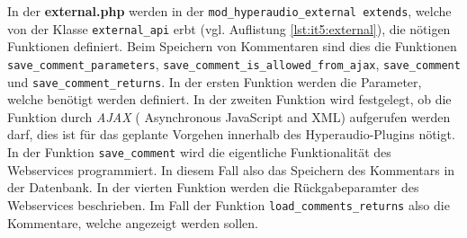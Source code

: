 In der \textbf{external.php} werden in der \texttt{mod_hyperaudio_external extends}, welche von der Klasse \texttt{external_api} erbt (vgl. Auflistung \ref{lst:it5:external}), die nötigen Funktionen definiert. Beim Speichern von Kommentaren sind dies die Funktionen \texttt{save_comment_parameters}, \texttt{save_comment_is_allowed_from_ajax}, \texttt{save_comment} und \texttt{save_comment_returns}. In der ersten Funktion werden die Parameter, welche benötigt werden definiert. In der zweiten Funktion wird festgelegt, ob die Funktion durch \textit{AJAX} ( Asynchronous JavaScript and XML) aufgerufen werden darf, dies ist für das geplante Vorgehen innerhalb des Hyperaudio-Plugins nötigt. In der Funktion \texttt{save_comment} wird die eigentliche Funktionalität des Webservices programmiert. In diesem Fall also das Speichern des Kommentars in der Datenbank. In der vierten Funktion werden die Rückgabeparamter des Webservices beschrieben. Im Fall der Funktion \texttt{load_comments_returns} also die Kommentare, welche angezeigt werden sollen.

